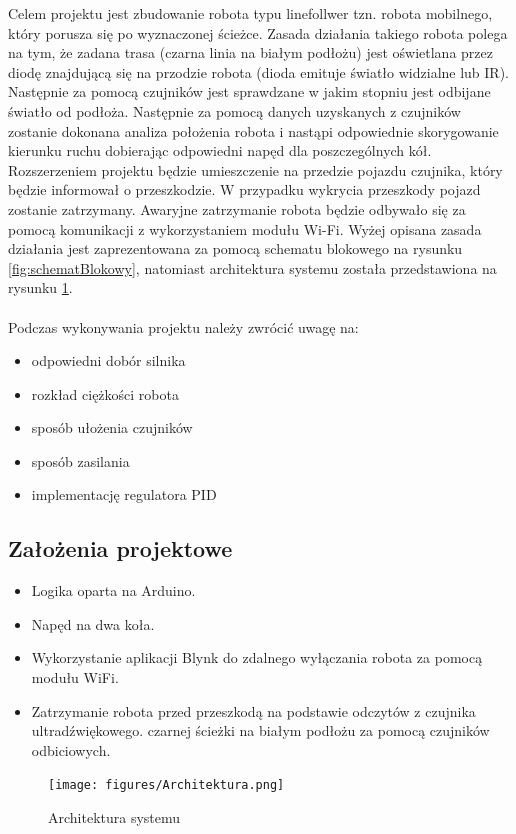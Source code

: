 \documentclass[10pt, a4paper]{article}
\begin{document}
Celem projektu jest zbudowanie robota typu linefollwer tzn. robota mobilnego, który porusza się po wyznaczonej ścieżce. Zasada działania takiego robota polega na tym, że zadana trasa (czarna linia na białym podłożu) jest oświetlana przez diodę znajdującą się na przodzie robota (dioda emituje światło widzialne lub IR). Następnie za pomocą czujników jest sprawdzane w jakim stopniu jest odbijane światło od podłoża. Następnie za pomocą danych uzyskanych z czujników zostanie dokonana analiza położenia robota i nastąpi odpowiednie skorygowanie kierunku ruchu dobierając odpowiedni napęd dla poszczególnych kół. Rozszerzeniem projektu będzie umieszczenie na przedzie pojazdu czujnika, który będzie informował o przeszkodzie. W przypadku wykrycia przeszkody pojazd zostanie zatrzymany. Awaryjne zatrzymanie robota będzie odbywało się za pomocą komunikacji z wykorzystaniem modułu Wi-Fi. Wyżej opisana zasada działania jest zaprezentowana za pomocą schematu blokowego na rysunku \ref{fig:schematBlokowy}, natomiast architektura systemu została przedstawiona na rysunku \ref{fig:Architektura}. \\ \\
Podczas wykonywania projektu należy zwrócić uwagę na:
\begin{itemize}
    \item odpowiedni dobór silnika
    \item rozkład ciężkości robota
    \item sposób ułożenia czujników
    \item sposób zasilania
    \item implementację regulatora PID
\end{itemize}

\subsection{Założenia projektowe}

\begin{itemize}
    \item Logika oparta na Arduino.
    \item Napęd na dwa koła.
    \item Wykorzystanie aplikacji Blynk do zdalnego wyłączania robota za pomocą modułu WiFi.
    \item Zatrzymanie robota przed przeszkodą na podstawie odczytów z czujnika ultradźwiękowego.
     czarnej ścieżki na białym podłożu za pomocą czujników odbiciowych.
\end{itemize}
\newpage
\begin{figure}[H]
	\centering
	\texttt{[image: figures/Architektura.png]}
	\caption{Architektura systemu}
	\label{fig:Architektura}
\end{figure}
\end{document}
